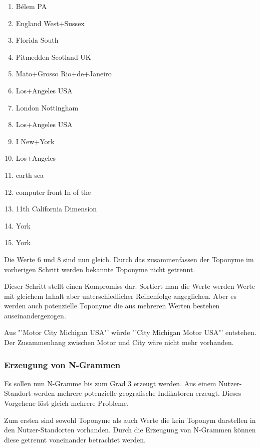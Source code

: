				\begin{multicols}{2}
					\begin{enumerate}
						\item Bélem PA
						\item England West+Sussex
						\item Florida South
						\item Pitmedden Scotland UK
						\item Mato+Grosso Rio+de+Janeiro
						\item Los+Angeles USA
						\item London Nottingham
						\item Los+Angeles USA
						\item I New+York 
						\item Los+Angeles
						\item earth sea
						\item computer front In of the 
						\item 11th California Dimension 
						\item York
						\item York
					\end{enumerate}
				\end{multicols}

				Die Werte 6 und 8 sind nun gleich. 
				Durch das zusammenfassen der Toponyme im vorherigen Schritt werden bekannte Toponyme nicht getrennt.

				Dieser Schritt stellt einen Kompromiss dar.
				Sortiert man die Werte werden Werte mit gleichem Inhalt aber unterschiedlicher Reihenfolge angeglichen.
				Aber es werden auch potenzielle Toponyme die aus mehreren Werten bestehen auseinandergezogen.

				Aus "'Motor City Michigan USA"' würde "'City Michigan Motor USA"' entstehen.
				Der Zusammenhang zwischen Motor und City wäre nicht mehr vorhanden.  


			\subsubsection{Erzeugung von N-Grammen}

				Es sollen nun N-Gramme bis zum Grad 3 erzeugt werden. 
				Aus einem Nutzer-Standort werden mehrere potenzielle geografische Indikatoren erzeugt.
				Dieses Vorgehene löst gleich mehrere Probleme.

				Zum ersten sind sowohl Toponyme als auch Werte die kein Toponym darstellen in den Nutzer-Standorten vorhanden.
				Durch die Erzeugung von N-Grammen können diese getrennt voneinander betrachtet werden.

